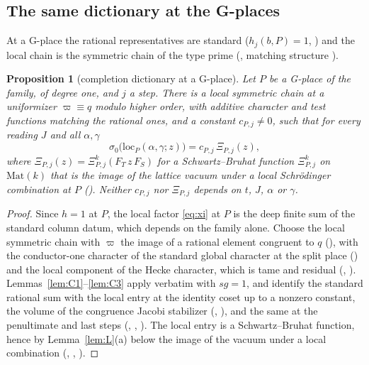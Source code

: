 \documentclass[11pt]{article}
\newcommand{\Mat}{\mathrm{Mat}}
\newtheorem{proposition}[theorem]{Proposition}
\theoremstyle{definition}
\theoremstyle{remark}
\begin{document}
\subsection{The same dictionary at the G-places}

At a G-place the rational representatives are standard ($h_j(b,P)=1$, ) and the local chain is the symmetric chain of the type prime (, matching structure ).

\begin{proposition}[completion dictionary at a G-place]\label{prop:Cty}
Let $P$ be a G-place of the family, of degree one, and $j$ a step. There is a local symmetric chain at a uniformizer $\varpi\equiv q$ modulo higher order, with additive character and test functions matching the rational ones, and a constant $c_{P,j}\ne0$, such that for every reading $J$ and all $\alpha,\gamma$
\[
\sigma_0\big(\mathrm{loc}_P(\alpha,\gamma;z)\big)=c_{P,j}\,\Xi_{P,j}(z),
\]
where $\Xi_{P,j}(z)=\Xi^{k}_{P,j}(F_T\,z\,F_S)$ for a Schwartz--Bruhat function $\Xi^{k}_{P,j}$ on $\Mat(k)$ that is the image of the lattice vacuum under a local Schr\"odinger combination at $P$ (). Neither $c_{P,j}$ nor $\Xi_{P,j}$ depends on $t$, $J$, $\alpha$ or $\gamma$.
\end{proposition}

\begin{proof}
Since $h=1$ at $P$, the local factor \eqref{eq:xi} at $P$ is the deep finite sum of the standard column datum, which depends on the family alone. Choose the local symmetric chain with $\varpi$ the image of a rational element congruent to $q$ (), with the conductor-one character of the standard global character at the split place () and the local component of the Hecke character, which is tame and residual (, ). Lemmas~\ref{lem:C1}--\ref{lem:C3} apply verbatim with $sg=1$, and identify the standard rational sum with the local entry at the identity coset up to a nonzero constant, the volume of the congruence Jacobi stabilizer (, ), and the same at the penultimate and last steps (, , ). The local entry is a Schwartz--Bruhat function, hence by Lemma~\ref{lem:L}(a) below the image of the vacuum under a local combination (, , ).
\end{proof}
\end{document}
